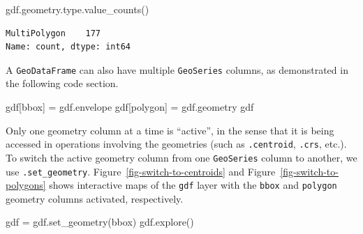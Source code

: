 \documentclass[
  letterpaper,
]{krantz}
\newenvironment{Shaded}{\begin{snugshade}}{\end{snugshade}}
\newcommand{\BuiltInTok}[1]{\textcolor[rgb]{0.00,0.23,0.31}{#1}}
\newcommand{\NormalTok}[1]{\textcolor[rgb]{0.00,0.23,0.31}{#1}}
\newcommand{\OperatorTok}[1]{\textcolor[rgb]{0.37,0.37,0.37}{#1}}
\newcommand{\StringTok}[1]{\textcolor[rgb]{0.13,0.47,0.30}{#1}}
\begin{document}
\begin{Shaded}
\begin{Highlighting}[]
\NormalTok{gdf.geometry.}\BuiltInTok{type}\NormalTok{.value\_counts()}
\end{Highlighting}
\end{Shaded}

\begin{verbatim}
MultiPolygon    177
Name: count, dtype: int64
\end{verbatim}

A \texttt{GeoDataFrame} can also have multiple \texttt{GeoSeries}
columns, as demonstrated in the following code section.

\begin{Shaded}
\begin{Highlighting}[]
\NormalTok{gdf[}\StringTok{\textquotesingle{}bbox\textquotesingle{}}\NormalTok{] }\OperatorTok{=}\NormalTok{ gdf.envelope}
\NormalTok{gdf[}\StringTok{\textquotesingle{}polygon\textquotesingle{}}\NormalTok{] }\OperatorTok{=}\NormalTok{ gdf.geometry}
\NormalTok{gdf}
\end{Highlighting}
\end{Shaded}

Only one geometry column at a time is ``active'', in the sense that it
is being accessed in operations involving the geometries (such as
\texttt{.centroid}, \texttt{.crs}, etc.). To switch the active geometry
column from one \texttt{GeoSeries} column to another, we use
\texttt{.set\_geometry}. Figure~\ref{fig-switch-to-centroids} and
Figure~\ref{fig-switch-to-polygons} shows interactive maps of the
\texttt{gdf} layer with the
\texttt{\textquotesingle{}bbox\textquotesingle{}} and
\texttt{\textquotesingle{}polygon\textquotesingle{}} geometry columns
activated, respectively.

\begin{Shaded}
\begin{Highlighting}[]
\NormalTok{gdf }\OperatorTok{=}\NormalTok{ gdf.set\_geometry(}\StringTok{\textquotesingle{}bbox\textquotesingle{}}\NormalTok{)}
\NormalTok{gdf.explore()}
\end{Highlighting}
\end{Shaded}
\end{document}

